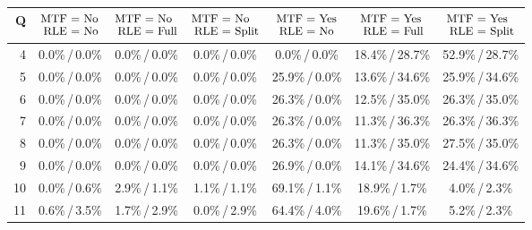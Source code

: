 \newcommand{\perc}[2]{\small #1\%\,/\,#2\%}
\newcommand{\p}{\phantom{0}}

\begin{tabular}{r|c|c|c|c|c|c}
	Q
	&
	$\begin{aligned}
		\text{\small MTF }&\text{\small = No} \\[-5pt]
		\text{\small RLE }&\text{\small = No}
	\end{aligned}$
	&
	$\begin{aligned}
		\text{\small MTF }&\text{\small = No} \\[-5pt]
		\text{\small RLE }&\text{\small = Full}
	\end{aligned}$
	&
	$\begin{aligned}
		\text{\small MTF }&\text{\small = No} \\[-5pt]
		\text{\small RLE }&\text{\small = Split}
	\end{aligned}$
	&
	$\begin{aligned}
		\text{\small MTF }&\text{\small = Yes} \\[-5pt]
		\text{\small RLE }&\text{\small = No}
	\end{aligned}$
	&
	$\begin{aligned}
		\text{\small MTF }&\text{\small = Yes} \\[-5pt]
		\text{\small RLE }&\text{\small = Full}
	\end{aligned}$
	&
	$\begin{aligned}
		\text{\small MTF }&\text{\small = Yes} \\[-5pt]
		\text{\small RLE }&\text{\small = Split}
	\end{aligned}$
	\\
	\hline
	 4 & \perc{0.0}{0.0} & \perc{0.0}{0.0} & \perc{0.0}{0.0} & \perc{\p0.0}{0.0} & \perc{18.4}{28.7}  & \perc{52.9}{28.7}   \\
	 5 & \perc{0.0}{0.0} & \perc{0.0}{0.0} & \perc{0.0}{0.0} & \perc{25.9}{0.0}  & \perc{13.6}{34.6}  & \perc{25.9}{34.6}   \\
	 6 & \perc{0.0}{0.0} & \perc{0.0}{0.0} & \perc{0.0}{0.0} & \perc{26.3}{0.0}  & \perc{12.5}{35.0}  & \perc{26.3}{35.0}   \\
	 7 & \perc{0.0}{0.0} & \perc{0.0}{0.0} & \perc{0.0}{0.0} & \perc{26.3}{0.0}  & \perc{11.3}{36.3}  & \perc{26.3}{36.3}   \\
	 8 & \perc{0.0}{0.0} & \perc{0.0}{0.0} & \perc{0.0}{0.0} & \perc{26.3}{0.0}  & \perc{11.3}{35.0}  & \perc{27.5}{35.0}   \\
	 9 & \perc{0.0}{0.0} & \perc{0.0}{0.0} & \perc{0.0}{0.0} & \perc{26.9}{0.0}  & \perc{14.1}{34.6}  & \perc{24.4}{34.6}   \\
	10 & \perc{0.0}{0.6} & \perc{2.9}{1.1} & \perc{1.1}{1.1} & \perc{69.1}{1.1}  & \perc{18.9}{\p1.7} & \perc{\p4.0}{\p2.3} \\
	11 & \perc{0.6}{3.5} & \perc{1.7}{2.9} & \perc{0.0}{2.9} & \perc{64.4}{4.0}  & \perc{19.6}{\p1.7} & \perc{\p5.2}{\p2.3} \\
\end{tabular}